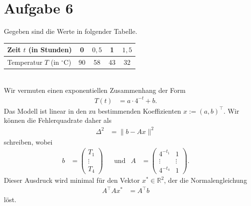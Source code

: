 \documentclass[english, parskip=full]{scrartcl}
\newcommand{\tecxt}{}
\begin{document}
\section*{Aufgabe 6}
Gegeben sind die Werte in folgender Tabelle. 
\begin{table}[!ht]
\centering
\begin{tabular}{l|c|c|c|c}
Zeit $t$ (in Stunden) & 0 & $0,5$ & 1 & $1,5$\\ \hline
Temperatur $T$ (in $^\circ$C) & 90 & 58 & 43 & 32\\
\end{tabular}
\end{table}
\\
Wir vermuten einen exponentiellen Zusammenhang der Form
\begin{align}
T(t) &= a\cdot 4^{-t} + b.
\end{align}
Das Modell ist linear in den zu bestimmenden Koeffizienten $x := (a,b)^\top$.
Wir können die Fehlerquadrate daher als
\begin{align}
\Delta^2 &= \| b - Ax\|^2
\end{align}
schreiben, wobei 
\begin{align}
b &= \begin{pmatrix}
T_1 \\ \vdots \\ T_4
\end{pmatrix} &&\tecxt\text{und}& A &= \begin{pmatrix}
4^{-t_1} & 1 \\ \vdots & \vdots \\ 4^{-t_4} & 1
\end{pmatrix}.
\end{align}
Dieser Ausdruck wird minimal für den Vektor $x^\ast\in\mathbb{R}^2$, der die Normalengleichung
\begin{align}
A^\top Ax^\ast &= A^\top b
\end{align}
löst.
\end{document}
